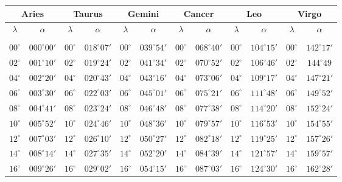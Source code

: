 \clearpage
\begin{table}[!h]
\vspace{0.25cm}
\centering
{\scriptsize \begin{tabular}{cc|cc|cc|cc|cc|cc}
\multicolumn{2}{c}{Aries}\vline & \multicolumn{2}{c}{Taurus} \vline& \multicolumn{2}{c}{Gemini} \vline& \multicolumn{2}{c}{Cancer}\vline &
\multicolumn{2}{c}{Leo}\vline & \multicolumn{2}{c}{Virgo}\\\hline
$\lambda$& $\alpha$& $\lambda$& $\alpha$& $\lambda$& $\alpha$& $\lambda$& $\alpha$& $\lambda$& $\alpha$& $\lambda$& $\alpha$\\\hline
&&&&&&&&&&&\\[-2ex]
$00^\circ$ & $000^\circ00'$ & $00^\circ$ & $018^\circ07'$ & $00^\circ$ & $039^\circ54'$ & $00^\circ$ & $068^\circ40'$ & $00^\circ$ & $104^\circ15'$ & $00^\circ$ & $142^\circ17'$\\
$02^\circ$ & $001^\circ10'$ & $02^\circ$ & $019^\circ24'$ & $02^\circ$ & $041^\circ34'$ & $02^\circ$ & $070^\circ52'$ & $02^\circ$ & $106^\circ46'$ & $02^\circ$ & $144^\circ49$\\
$04^\circ$ & $002^\circ20'$ & $04^\circ$ & $020^\circ43'$ & $04^\circ$ & $043^\circ16'$ & $04^\circ$ & $073^\circ06'$ & $04^\circ$ & $109^\circ17'$ & $04^\circ$ & $147^\circ21'$\\
$06^\circ$ & $003^\circ30'$ & $06^\circ$ & $022^\circ03'$ & $06^\circ$ & $045^\circ01'$ & $06^\circ$ & $075^\circ21'$ & $06^\circ$ & $111^\circ48'$ & $06^\circ$ & $149^\circ52'$\\
$08^\circ$ & $004^\circ41'$ & $08^\circ$ & $023^\circ24'$ & $08^\circ$ & $046^\circ48'$ & $08^\circ$ & $077^\circ38'$ & $08^\circ$ & $114^\circ20'$ & $08^\circ$ & $152^\circ24'$\\
$10^\circ$ & $005^\circ52'$ & $10^\circ$ & $024^\circ46'$ & $10^\circ$ & $048^\circ36'$ & $10^\circ$ & $079^\circ57'$ & $10^\circ$ & $116^\circ53'$ & $10^\circ$ & $154^\circ55'$\\
$12^\circ$ & $007^\circ03'$ & $12^\circ$ & $026^\circ10'$ & $12^\circ$ & $050^\circ27'$ & $12^\circ$ & $082^\circ18'$ & $12^\circ$ & $119^\circ25'$ & $12^\circ$ & $157^\circ26'$\\
$14^\circ$ & $008^\circ14'$ & $14^\circ$ & $027^\circ35'$ & $14^\circ$ & $052^\circ20'$ & $14^\circ$ & $084^\circ39'$ & $14^\circ$ & $121^\circ57'$ & $14^\circ$ & $159^\circ57'$\\
$16^\circ$ & $009^\circ26'$ & $16^\circ$ & $029^\circ02'$ & $16^\circ$ & $054^\circ15'$ & $16^\circ$ & $087^\circ03'$ & $16^\circ$ & $124^\circ30'$ & $16^\circ$ & $162^\circ28'$\\

\end{tabular}}
\end{table}
